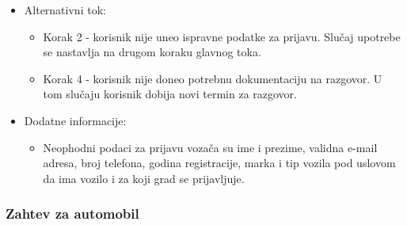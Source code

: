 \begin{itemize}
\begin{enumerate}
		\end{enumerate}
	\item Alternativni tok:
		\begin{itemize}
    		\item Korak 2 - korisnik nije uneo ispravne podatke za prijavu. Slučaj upotrebe se nastavlja na drugom koraku glavnog toka.
		    \item Korak 4 - korisnik nije doneo potrebnu dokumentaciju na razgovor. U tom slučaju korisnik dobija novi termin za razgovor.
		\end{itemize}
	\item Dodatne informacije:
		\begin{itemize}
			\item Neophodni podaci za prijavu vozača su ime i prezime, validna e-mail adresa, broj telefona, godina registracije, marka i tip vozila pod uslovom da ima vozilo i za koji grad se prijavljuje.
		\end{itemize}						
\end{itemize}


\subsubsection{\bfseries Zahtev za automobil}

